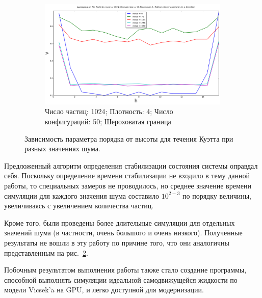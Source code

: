 \begin{figure}
\begin{subfigure}{}
        \end{subfigure}
        \begin{subfigure}{}
            \includegraphics[height=\textheight/3]{Images/1k_x50_NotMirror}
            \caption{Число частиц: 1024; Плотность: 4; Число конфигураций: 50; Шероховатая граница}
            \label{fig:Results:4kNew}
        \end{subfigure}
    \caption{Зависимость параметра порядка от высоты для течения Куэтта при разных значениях шума.}
    \label{fig:Results}
\end{figure}

Предложенный алгоритм определения стабилизации состояния системы оправдал себя. Поскольку определение времени стабилизации не входило в тему данной работы, то специальных замеров не проводилось, но среднее значение времени симуляции для каждого значения шума составило $10^{2-3}$ по порядку величины, увеличиваясь с увеличением количества частиц.

Кроме того, были проведены более длительные симуляции для отдельных значений шума (в частности, очень большого и очень низкого). Полученные результаты не вошли в эту работу по причине того, что они аналогичны представленным на рис.~\ref{fig:Results}.

Побочным результатом выполнения работы также стало создание программы, способной выполнять симуляции идеальной самодвижущейся жидкости по модели Vicsek'a на GPU, и легко доступной для модернизации.
   
